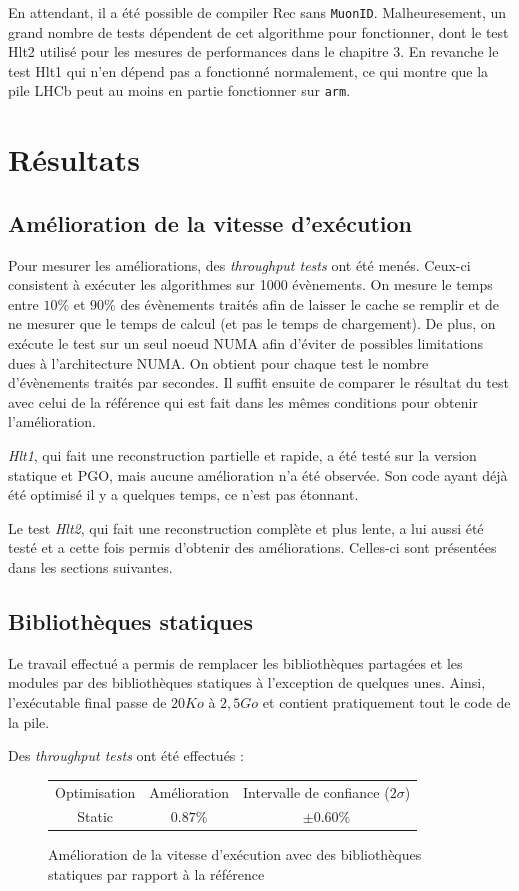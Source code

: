 \documentclass[a4paper,11pt]{report}
\begin{document}
En attendant, il a été possible de compiler Rec sans \verb'MuonID'.
Malheuresement, un grand nombre de tests dépendent de cet algorithme pour fonctionner, dont le test Hlt2 utilisé pour les mesures de performances dans le chapitre 3.
En revanche le test Hlt1 qui n'en dépend pas a fonctionné normalement, ce qui montre que la pile LHCb peut au moins en partie fonctionner sur \verb'arm'.


\chapter{Résultats}

\section{Amélioration de la vitesse d'exécution}
Pour mesurer les améliorations, des \emph{throughput tests} ont été menés.
Ceux-ci consistent à exécuter les algorithmes sur 1000 évènements.
On mesure le temps entre $10\%$ et $90\%$ des évènements traités afin de laisser le cache se remplir et de ne mesurer que le temps de calcul (et pas le temps de chargement).
De plus, on exécute le test sur un seul noeud NUMA afin d'éviter de possibles limitations dues à l'architecture NUMA.
On obtient pour chaque test le nombre d'évènements traités par secondes.
Il suffit ensuite de comparer le résultat du test avec celui de la référence qui est fait dans les mêmes conditions pour obtenir l'amélioration.

\emph{Hlt1}, qui fait une reconstruction partielle et rapide, a été testé sur la version statique et PGO, mais aucune amélioration n'a été observée.
Son code ayant déjà été optimisé il y a quelques temps, ce n'est pas étonnant.

Le test \emph{Hlt2}, qui fait une reconstruction complète et plus lente, a lui aussi été testé et a cette fois permis d'obtenir des améliorations.
Celles-ci sont présentées dans les sections suivantes.

\section{Bibliothèques statiques}
Le travail effectué a permis de remplacer les bibliothèques partagées et les modules par des bibliothèques statiques à l'exception de quelques unes.
Ainsi, l'exécutable final passe de $20 Ko$ à $2,5 Go$ et contient pratiquement tout le code de la pile.

Des \emph{throughput tests} ont été effectués :
\begin{figure}[H]
    \begin{center}
        \begin{tabular}{ c c c }
            Optimisation & Amélioration & Intervalle de confiance ($2\sigma$) \\
            Static       & $0.87\%$     & $\pm 0.60\%$
        \end{tabular}
    \end{center}
    \caption{Amélioration de la vitesse d'exécution avec des bibliothèques statiques par rapport à la référence}
    \label{results_static}
\end{figure}
\end{document}
